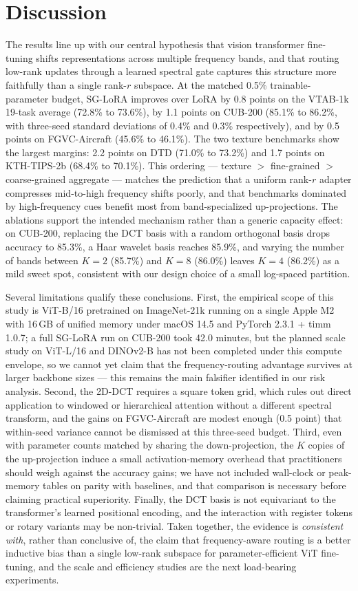 \documentclass{article}
\begin{document}
\section{Discussion}
The results line up with our central hypothesis that vision transformer fine-tuning shifts representations across multiple frequency bands, and that routing low-rank updates through a learned spectral gate captures this structure more faithfully than a single rank-$r$ subspace. At the matched 0.5\% trainable-parameter budget, SG-LoRA improves over LoRA by 0.8 points on the VTAB-1k 19-task average (72.8\% to 73.6\%), by 1.1 points on CUB-200 (85.1\% to 86.2\%, with three-seed standard deviations of 0.4\% and 0.3\% respectively), and by 0.5 points on FGVC-Aircraft (45.6\% to 46.1\%). The two texture benchmarks show the largest margins: 2.2 points on DTD (71.0\% to 73.2\%) and 1.7 points on KTH-TIPS-2b (68.4\% to 70.1\%). This ordering — texture $>$ fine-grained $>$ coarse-grained aggregate — matches the prediction that a uniform rank-$r$ adapter compresses mid-to-high frequency shifts poorly, and that benchmarks dominated by high-frequency cues benefit most from band-specialized up-projections. The ablations support the intended mechanism rather than a generic capacity effect: on CUB-200, replacing the DCT basis with a random orthogonal basis drops accuracy to 85.3\%, a Haar wavelet basis reaches 85.9\%, and varying the number of bands between $K{=}2$ (85.7\%) and $K{=}8$ (86.0\%) leaves $K{=}4$ (86.2\%) as a mild sweet spot, consistent with our design choice of a small log-spaced partition.

Several limitations qualify these conclusions. First, the empirical scope of this study is ViT-B/16 pretrained on ImageNet-21k running on a single Apple M2 with 16\,GB of unified memory under macOS 14.5 and PyTorch 2.3.1 + timm 1.0.7; a full SG-LoRA run on CUB-200 took 42.0 minutes, but the planned scale study on ViT-L/16 and DINOv2-B has not been completed under this compute envelope, so we cannot yet claim that the frequency-routing advantage survives at larger backbone sizes — this remains the main falsifier identified in our risk analysis. Second, the 2D-DCT requires a square token grid, which rules out direct application to windowed or hierarchical attention without a different spectral transform, and the gains on FGVC-Aircraft are modest enough (0.5 point) that within-seed variance cannot be dismissed at this three-seed budget. Third, even with parameter counts matched by sharing the down-projection, the $K$ copies of the up-projection induce a small activation-memory overhead that practitioners should weigh against the accuracy gains; we have not included wall-clock or peak-memory tables on parity with baselines, and that comparison is necessary before claiming practical superiority. Finally, the DCT basis is not equivariant to the transformer's learned positional encoding, and the interaction with register tokens or rotary variants may be non-trivial. Taken together, the evidence is \emph{consistent with}, rather than conclusive of, the claim that frequency-aware routing is a better inductive bias than a single low-rank subspace for parameter-efficient ViT fine-tuning, and the scale and efficiency studies are the next load-bearing experiments.
\end{document}
